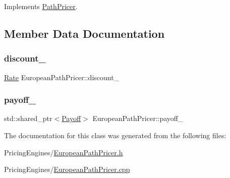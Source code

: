 Implements \hyperlink{class_path_pricer_a057bf6a83f0cc2be06154144192ed918}{Path\+Pricer}.



\subsection{Member Data Documentation}
\hypertarget{class_european_path_pricer_a1bb1874fe4f263bff17a998f0ec9588c}{}\label{class_european_path_pricer_a1bb1874fe4f263bff17a998f0ec9588c} 
\subsubsection{\texorpdfstring{discount\+\_\+}{discount\_}}
{\footnotesize\ttfamily \hyperlink{_name_def_8h_a25bee43a162de339c81f3d1caf6b887d}{Rate} European\+Path\+Pricer\+::discount\+\_\+\hspace{0.3cm}{\ttfamily [private]}}

\hypertarget{class_european_path_pricer_a2023ec56bae32c6db123e8d400d2b0cf}{}\label{class_european_path_pricer_a2023ec56bae32c6db123e8d400d2b0cf} 
\subsubsection{\texorpdfstring{payoff\+\_\+}{payoff\_}}
{\footnotesize\ttfamily std\+::shared\+\_\+ptr$<$\hyperlink{class_payoff}{Payoff}$>$ European\+Path\+Pricer\+::payoff\+\_\+\hspace{0.3cm}{\ttfamily [private]}}



The documentation for this class was generated from the following files\+:\begin{DoxyCompactItemize}
\item 
Pricing\+Engines/\hyperlink{_european_path_pricer_8h}{European\+Path\+Pricer.\+h}\item 
Pricing\+Engines/\hyperlink{_european_path_pricer_8cpp}{European\+Path\+Pricer.\+cpp}\end{DoxyCompactItemize}

